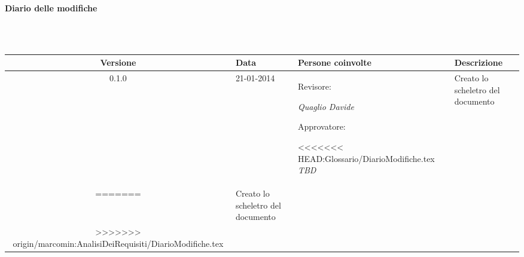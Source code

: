 \noindent\begin{Large}\textbf{Diario delle modifiche}\end{Large}\\
\\
\begin{small}
\begin{tabular}{|c|p{1.7cm}|p{2.8cm}|p{7cm}|}
\hline
Versione & Data & Persone coinvolte & Descrizione \\
\hline
\hline
0.1.0 & 21-01-2014 & Revisore: 

\textit{Quaglio Davide}

Approvatore: 

<<<<<<< HEAD:Glossario/DiarioModifiche.tex
\textit{TBD} &  Creato lo scheletro del documento\\
=======
\textit{} &  Creato lo scheletro del documento\\
>>>>>>> origin/marcomin:AnalisiDeiRequisiti/DiarioModifiche.tex
\hline
\end{tabular}\\
\end{small}